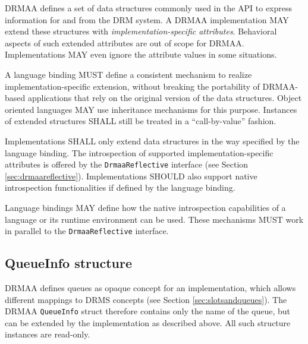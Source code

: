 \documentclass{article}
\newcommand{\h}[1]{\lstinline|#1|}
\newcommand{\langbind}[1]{\begin{shaded}#1\end{shaded}}
\newcommand{\rat}[1]{}
\begin{document}
DRMAA defines a set of data structures commonly used in the API to express information for and from the DRM system. A DRMAA implementation MAY extend these structures with \emph{implementation-specific attributes}. Behavioral aspects of such extended attributes are out of scope for DRMAA. Implementations MAY even ignore the attribute values in some situations.

\langbind{
A language binding MUST define a consistent mechanism to realize implementation-specific extension, without breaking the portability of DRMAA-based applications that rely on the original version of the data structures. Object oriented languages MAY use inheritance mechanisms for this purpose. Instances of extended structures SHALL still be treated in a \enquote{call-by-value} fashion.
}

Implementations SHALL only extend data structures in the way specified by the language binding. The introspection of supported implementation-specific attributes is offered by the \h{DrmaaReflective} interface (see Section \ref{sec:drmaareflective}). Implementations SHOULD also support native introspection functionalities if defined by the language binding.

\langbind{
Language bindings MAY define how the native introspection capabilities of a language or its runtime environment can be used. These mechanisms MUST work in parallel to the \h{DrmaaReflective} interface.
}

\rat{
Comparison to DRMAA 1.0: The binding of job template attribute names and exception names to strings was removed. Language bindings have to define their own mapping, if needed.

One example for native language introspection support could be attributes.

There was a discussion to remove the attribute ignorance possibility for implementations, in order to have a defined error when unknown attributes are used. This was rejected on the Apr. 13th conf call, since applications do not need the error as indication for missing attribute support. Instead, they should use the given introspection capabilities.
}

\subsection{QueueInfo structure}
\label{sec:queue}

DRMAA defines queues as opaque concept for an implementation, which allows different mappings to DRMS concepts (see Section \ref{sec:slotsandqueues}). The DRMAA \h{QueueInfo} struct therefore contains only the name of the queue, but can be extended by the implementation as described above. All such structure instances are read-only.
\end{document}

